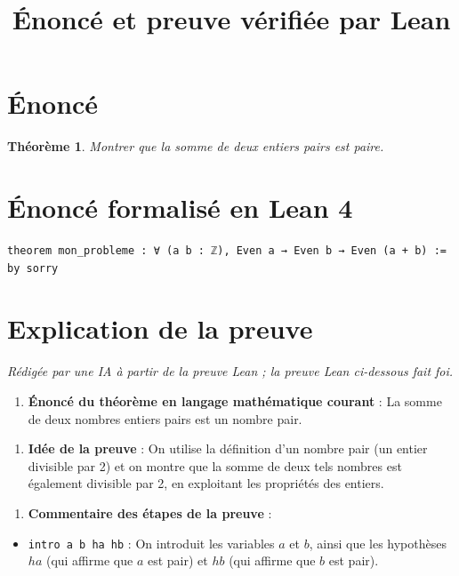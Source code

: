 \documentclass[11pt]{article}
\title{Énoncé et preuve vérifiée par Lean}
\author{}
\date{}
\theoremstyle{plain}
\newtheorem{theorem}{Théorème}
\begin{document}
\maketitle

\section*{Énoncé}
\begin{theorem}
Montrer que la somme de deux entiers pairs est paire.
\end{theorem}

\section*{Énoncé formalisé en Lean 4}
\begin{Verbatim}[breaklines=true,frame=single,fontsize=\small,rulecolor=\color{black!25}]
theorem mon_probleme : ∀ (a b : ℤ), Even a → Even b → Even (a + b) := by sorry
\end{Verbatim}

\section*{Explication de la preuve}
\emph{Rédigée par une IA à partir de la preuve Lean ; la preuve Lean ci-dessous fait foi.}

\begin{enumerate}
\item \textbf{Énoncé du théorème en langage mathématique courant} : La somme de deux nombres entiers pairs est un nombre pair.
\end{enumerate}

\begin{enumerate}
\item \textbf{Idée de la preuve} : On utilise la définition d’un nombre pair (un entier divisible par 2) et on montre que la somme de deux tels nombres est également divisible par 2, en exploitant les propriétés des entiers.
\end{enumerate}

\begin{enumerate}
\item \textbf{Commentaire des étapes de la preuve} :
\end{enumerate}

\begin{itemize}
\item \texttt{intro a b ha hb} : On introduit les variables $a$ et $b$, ainsi que les hypothèses $ha$ (qui affirme que $a$ est pair) et $hb$ (qui affirme que $b$ est pair).
\end{itemize}
\end{document}
